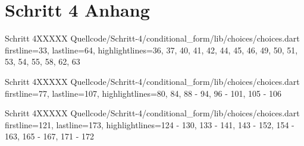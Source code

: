 \clearpage

\section{Schritt 4 Anhang} 
\label{appendix:Schritt4Anhang}

\begin{alexlisting}{Schritt 4}{XXXXX}
    {Quellcode/Schritt-4/conditional_form/lib/choices/choices.dart}
    {firstline=33, lastline=64, highlightlines={36, 37, 40, 41, 42, 44, 45, 46, 49, 50, 51, 53, 54, 55, 58, 62, 63}}
    \label{lst:Schritt4KategorieChoice}
  \end{alexlisting}

  \begin{alexlisting}{Schritt 4}{XXXXX}
    {Quellcode/Schritt-4/conditional_form/lib/choices/choices.dart}
    {firstline=77, lastline=107, highlightlines={80, 84, 88 - 94, 96 - 101, 105 - 106 }}
    \label{lst:Schritt4ZielflaecheChoice}
  \end{alexlisting}


  \begin{alexlisting}{Schritt 4}{XXXXX}
    {Quellcode/Schritt-4/conditional_form/lib/choices/choices.dart}
    {firstline=121, lastline=173, highlightlines={124 - 130, 133 - 141, 143 - 152, 154 - 163, 165 - 167, 171 - 172 }}
    \label{lst:Schritt4ZieleinheitChoice}
  \end{alexlisting}

  \clearpage